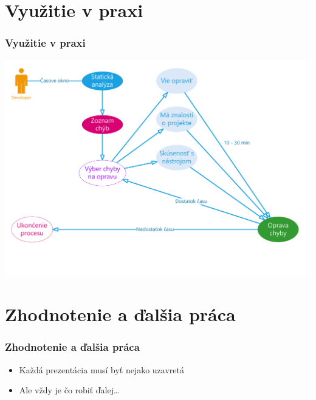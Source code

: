 \documentclass{beamer}
\begin{document}
\section{Využitie v praxi}

\begin{frame}[fragile=singleslide]\frametitle{Využitie v praxi}
	\centerline{\includegraphics[scale=0.38]{vyuzitie.pdf}}
\end{frame}


\section*{Zhodnotenie a ďalšia práca}

\begin{frame}[fragile=singleslide]\frametitle{Zhodnotenie a ďalšia práca}
	\begin{itemize}
		\item Každá prezentácia musí byť nejako uzavretá
		\item Ale vždy je čo robiť ďalej\ldots{}
	\end{itemize}
\end{frame}
\end{document}
